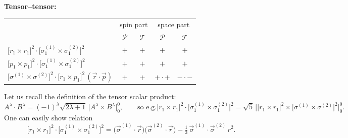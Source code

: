 \documentclass[11pt,a4paper]{article}
\begin{document}
\textbf{Tensor--tensor:}
\begin{center}
\renewcommand{\arraystretch}{1.3}
\begin{tabular}{l c c c c}
\hline
 & \multicolumn{2}{c}{spin part} & \multicolumn{2}{c}{space part}\\
 & $\mathcal P$ & $\mathcal T$ & $\mathcal P$ & $\mathcal T$ \\
\hline
$\big[r_1\times r_1\big]^2\cdot\big[\sigma^{(1)}_1\times\sigma^{(2)}_1\big]^2$ & $+$ & $+$ & $+$ & $+$ \\
$\big[p_1\times p_1\big]^2\cdot\big[\sigma^{(1)}_1\times\sigma^{(2)}_1\big]^2$ & $+$ & $+$ & $+$ & $+$ \\
$\big[\sigma^{(1)}\times\sigma^{(2)}\big]^2\cdot\big[r_1\times p_1\big]^2\,(\vec r\cdot\vec p)$ & $+$ & $+$ & $+$\,$\cdot$\,$+$ & $-$\,$\cdot$\,$-$ \\
\hline
\end{tabular}
\end{center}
Let us recall the definition of the tensor scalar product:
\[
A^\lambda\cdot B^\lambda=(-1)^\lambda\sqrt{2\lambda+1}\,\big[A^\lambda\times B^\lambda\big]^0_0,
\qquad
\text{so e.g.}
\big[r_1\times r_1\big]^2\cdot\big[\sigma^{(1)}_1\times\sigma^{(2)}_1\big]^2
=\sqrt5\,\Big[\big[r_1\times r_1\big]^2\times\big[\sigma^{(1)}\times\sigma^{(2)}\big]^2\Big]^0_0 .
\]
One can easily show relation
\[
\big[r_1\times r_1\big]^2\cdot\big[\sigma^{(1)}_1\times\sigma^{(2)}_1\big]^2
=\big(\vec\sigma^{(1)}\!\cdot\vec r\big)\big(\vec\sigma^{(2)}\!\cdot\vec r\big)
-\tfrac13\,\vec\sigma^{(1)}\!\cdot\vec\sigma^{(2)}\,r^2 .
\]
\end{document}
